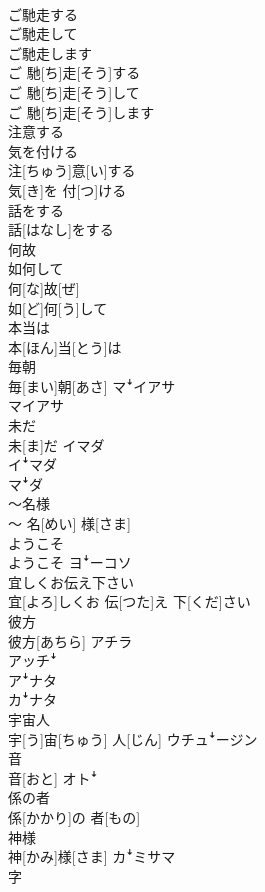 \documentclass[8pt]{extreport}
\begin{document}
\begin{CJK}{UTF8}{min}
\\	ご馳走する 
\\	ご馳走して 
\\	ご馳走します	
\\	ご 馳[ち]走[そう]する 
\\	ご 馳[ち]走[そう]して 
\\	ご 馳[ち]走[そう]します	
\\	注意する 
\\	気を付ける	
\\	注[ちゅう]意[い]する 
\\	気[き]を 付[つ]ける	
\\	話をする	
\\	話[はなし]をする	
\\	何故 
\\	如何して	
\\	何[な]故[ぜ] 
\\	如[ど]何[う]して	
\\	本当は	
\\	本[ほん]当[とう]は	
\\	毎朝	
\\	毎[まい]朝[あさ]	マꜜイアサ 
\\	マイアサ
\\	未だ	
\\	未[ま]だ	イマダ 
\\	イꜜマダ 
\\	マꜜダ
\\	〜名様	
\\	〜 名[めい] 様[さま]	
\\	ようこそ	
\\	ようこそ	ヨꜜーコソ
\\	宜しくお伝え下さい	
\\	宜[よろ]しくお 伝[つた]え 下[くだ]さい	
\\	彼方	
\\	彼方[あちら]	アチラ 
\\	アッチꜜ 
\\	アꜜナタ 
\\	カꜜナタ
\\	宇宙人	
\\	宇[う]宙[ちゅう] 人[じん]	ウチュꜜージン
\\	音	
\\	音[おと]	オトꜜ
\\	係の者	
\\	係[かかり]の 者[もの]	
\\	神様	
\\	神[かみ]様[さま]	カꜜミサマ
\\	字	

\end{CJK}
\end{document}
